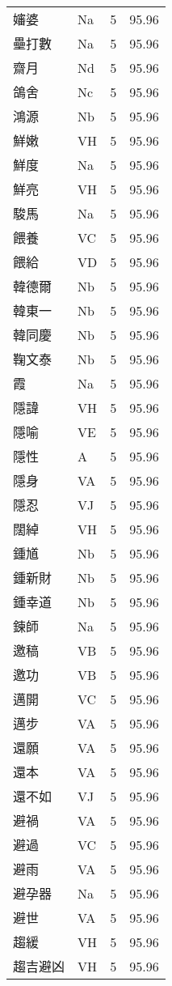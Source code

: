 \documentclass[twocolumn]{book}
\begin{document}
\begin{supertabular}{llrr}
嬸婆 & Na & 5 &  95.96\\
壘打數 & Na & 5 &  95.96\\
齋月 & Nd & 5 &  95.96\\
鴿舍 & Nc & 5 &  95.96\\
鴻源 & Nb & 5 &  95.96\\
鮮嫩 & VH & 5 &  95.96\\
鮮度 & Na & 5 &  95.96\\
鮮亮 & VH & 5 &  95.96\\
駿馬 & Na & 5 &  95.96\\
餵養 & VC & 5 &  95.96\\
餵給 & VD & 5 &  95.96\\
韓德爾 & Nb & 5 &  95.96\\
韓東一 & Nb & 5 &  95.96\\
韓同慶 & Nb & 5 &  95.96\\
鞠文泰 & Nb & 5 &  95.96\\
霞 & Na & 5 &  95.96\\
隱諱 & VH & 5 &  95.96\\
隱喻 & VE & 5 &  95.96\\
隱性 & A & 5 &  95.96\\
隱身 & VA & 5 &  95.96\\
隱忍 & VJ & 5 &  95.96\\
闊綽 & VH & 5 &  95.96\\
鍾馗 & Nb & 5 &  95.96\\
鍾新財 & Nb & 5 &  95.96\\
鍾幸道 & Nb & 5 &  95.96\\
鍊師 & Na & 5 &  95.96\\
邀稿 & VB & 5 &  95.96\\
邀功 & VB & 5 &  95.96\\
邁開 & VC & 5 &  95.96\\
邁步 & VA & 5 &  95.96\\
還願 & VA & 5 &  95.96\\
還本 & VA & 5 &  95.96\\
還不如 & VJ & 5 &  95.96\\
避禍 & VA & 5 &  95.96\\
避過 & VC & 5 &  95.96\\
避雨 & VA & 5 &  95.96\\
避孕器 & Na & 5 &  95.96\\
避世 & VA & 5 &  95.96\\
趨緩 & VH & 5 &  95.96\\
趨吉避凶 & VH & 5 &  95.96\\

\end{supertabular}
\end{document}
